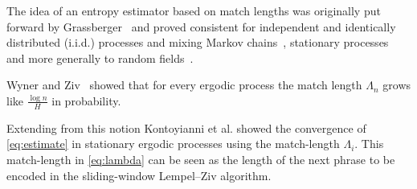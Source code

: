 The idea of an entropy estimator based on match lengths was originally put forward by Grassberger~\cite{grassbergerEstimatingInformationContent1989} and proved consistent for independent and identically distributed (i.i.d.) processes and mixing Markov chains~\cite{shieldsEntropyPrefixes1992}, stationary processes~\cite{kontoyiannisPrefixesEntropyRate1994} and more generally to random fields~\cite{quasEntropyEstimatorClass1999}.


Wyner and Ziv~\cite{wynerAsymptoticPropertiesEntropy1989} showed that for every ergodic process the match length $\Lambda_{n}$ grows like $\frac{\log{n}}{H}$ in probability. 

Extending from this notion Kontoyianni et al. showed the convergence of \autoref{eq:estimate} in stationary ergodic processes using the match-length $ \Lambda_{i}$. This match-length in \autoref{eq:lambda} can be seen as the length of the next phrase to be encoded in the sliding-window Lempel–Ziv algorithm.



